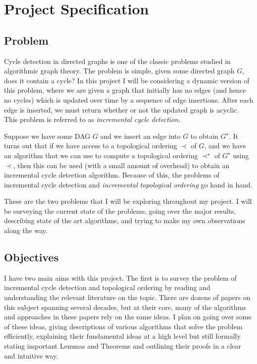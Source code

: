 \documentclass{article}
\begin{document}
\newpage

\appendix

\section{Project Specification}

\subsection{Problem}

Cycle detection in directed graphs is one of the classic problems studied in algorithmic graph theory. The problem is simple, given some directed graph $G$, does it contain a cycle? In this project I will be considering a dynamic version of this problem, where we are given a graph that initially has no edges (and hence no cycles) which is updated over time by a sequence of edge insertions. After each edge is inserted, we must return whether or not the updated graph is acyclic. This problem is referred to as \textit{incremental cycle detection}.

Suppose we have some DAG $G$ and we insert an edge into $G$ to obtain $G^{\star}$. It turns out that if we have access to a topological ordering $\prec$ of $G$, and we have an algorithm that we can use to compute a topological ordering $\prec^{\star}$ of $G^{\star}$ using $\prec$, then this can be used (with a small amount of overhead) to obtain an incremental cycle detection algorithm. Because of this, the problems of incremental cycle detection and \textit{incremental topological ordering} go hand in hand.

These are the two problems that I will be exploring throughout my project. I will be surveying the current state of the problems, going over the major results, describing state of the art algorithms, and trying to make my own observations along the way.

\subsection{Objectives}\label{objectives}

I have two main aims with this project. The first is to survey the problem of incremental cycle detection and topological ordering by reading and understanding the relevant literature on the topic. There are dozens of papers on this subject spanning several decades, but at their core, many of the algorithms and approaches in these papers rely on the same ideas. I plan on going over some of these ideas, giving descriptions of various algorithms that solve the problem efficiently, explaining their fundamental ideas at a high level but still formally stating important Lemmas and Theorems and outlining their proofs in a clear and intuitive way.
\end{document}
